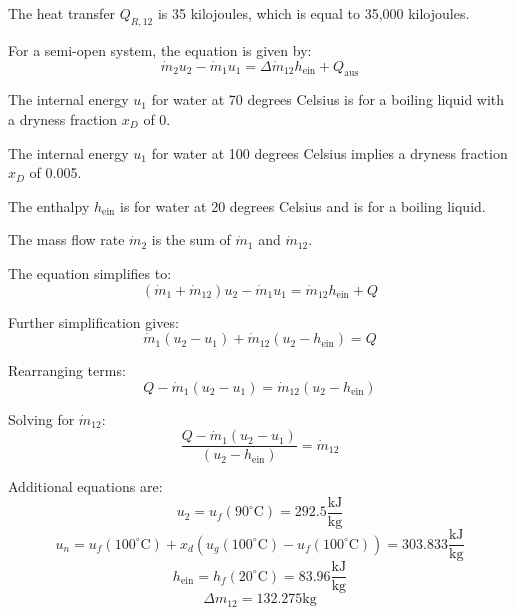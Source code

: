 The heat transfer \( Q_{R,12} \) is 35 kilojoules, which is equal to 35,000 kilojoules.

For a semi-open system, the equation is given by:
\[ \dot{m}_2 u_2 - \dot{m}_1 u_1 = \Delta \dot{m}_{12} h_{\text{ein}} + Q_{\text{aus}} \]

The internal energy \( u_1 \) for water at 70 degrees Celsius is for a boiling liquid with a dryness fraction \( x_D \) of 0.

The internal energy \( u_1 \) for water at 100 degrees Celsius implies a dryness fraction \( x_D \) of 0.005.

The enthalpy \( h_{\text{ein}} \) is for water at 20 degrees Celsius and is for a boiling liquid.

The mass flow rate \( \dot{m}_2 \) is the sum of \( \dot{m}_1 \) and \( \dot{m}_{12} \).

The equation simplifies to:
\[ (\dot{m}_1 + \dot{m}_{12}) u_2 - \dot{m}_1 u_1 = \dot{m}_{12} h_{\text{ein}} + Q \]

Further simplification gives:
\[ \dot{m}_1 (u_2 - u_1) + \dot{m}_{12} (u_2 - h_{\text{ein}}) = Q \]

Rearranging terms:
\[ Q - \dot{m}_1 (u_2 - u_1) = \dot{m}_{12} (u_2 - h_{\text{ein}}) \]

Solving for \( \dot{m}_{12} \):
\[ \frac{Q - \dot{m}_1 (u_2 - u_1)}{(u_2 - h_{\text{ein}})} = \dot{m}_{12} \]

Additional equations are:
\[ u_2 = u_f(90^\circ \text{C}) = 292.5 \frac{\text{kJ}}{\text{kg}} \]
\[ u_n = u_f(100^\circ \text{C}) + x_d \left( u_g(100^\circ \text{C}) - u_f(100^\circ \text{C}) \right) = 303.833 \frac{\text{kJ}}{\text{kg}} \]
\[ h_{\text{ein}} = h_f(20^\circ \text{C}) = 83.96 \frac{\text{kJ}}{\text{kg}} \]
\[ \Delta m_{12} = 132.275 \text{kg} \]